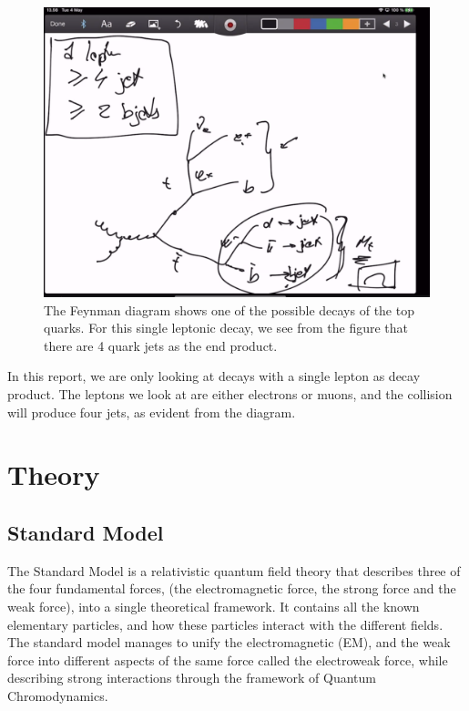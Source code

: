 \documentclass[12pt,a4paper]{article}
\begin{document}
\begin{figure}[H]
	\includegraphics[width=\linewidth]{Placeholder_FeynmanDiagram.png}
	\caption{The Feynman diagram shows one of the possible decays of the top
      quarks. For this single leptonic decay, we see from the figure that there
      are 4 quark jets as the end product.}\label{figfeynmandiagram}
\end{figure}

In this report, we are only looking at decays with a single lepton as decay
product. The leptons we look at are either electrons or muons, and the collision
will produce four jets, as evident from the diagram.

\section{Theory}

\subsection{Standard Model}
The Standard Model is a relativistic quantum field theory that describes three
of the four fundamental forces, (the electromagnetic force, the strong force and
the weak force), into a single theoretical framework. It contains all the known
elementary particles, and how these particles interact with the different
fields. The standard model manages to unify the electromagnetic (EM), and the
weak force into different aspects of the same force called the electroweak
force, while describing strong interactions through the framework of Quantum
Chromodynamics.\\
\end{document}
